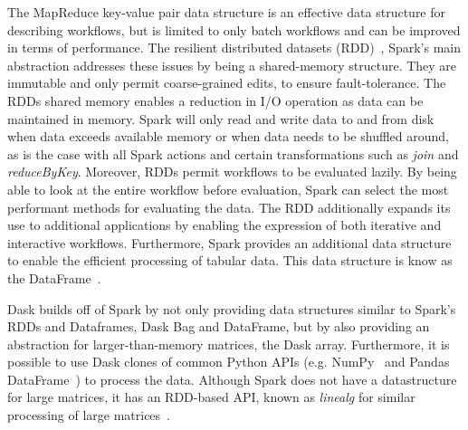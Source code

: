                 The MapReduce key-value pair data structure is an effective data
                structure for describing workflows, but is limited to only batch
                workflows and can be improved in terms of performance. The
                resilient distributed datasets
                (RDD)~\cite{Zaharia:2012:RDD:2228298.2228301}, Spark's main
                abstraction addresses these issues by being a shared-memory
                structure. They are immutable and only permit coarse-grained
                edits, to ensure fault-tolerance. The RDDs shared memory enables
                a reduction in I/O operation as data can be maintained in
                memory. Spark will only read and write data to and from disk
                when data exceeds available memory or when data needs to be
                shuffled around, as is the case with all Spark actions and
                certain transformations such as \textit{join} and
                \textit{reduceByKey}. Moreover, RDDs permit workflows to be
                evaluated lazily. By being able to look at the entire workflow
                before evaluation, Spark can select the most performant methods
                for evaluating the data. The RDD additionally expands its use to
                additional applications by enabling the expression of both
                iterative and interactive workflows. Furthermore, Spark provides
                an additional data structure to enable the efficient processing
                of tabular data. This data structure is know as the
                DataFrame~\cite{Armbrust:2015:SSR:2723372.2742797}.

                Dask builds off of Spark by not only providing data structures
                similar to Spark's RDDs and Dataframes, Dask Bag and DataFrame,
                but by also providing an abstraction for larger-than-memory
                matrices, the Dask array. Furthermore, it is possible to use
                Dask clones of common Python APIs (e.g.
                NumPy~\cite{Oliphant:2015:GN:2886196} and Pandas
                DataFrame~\cite{mckinney2011pandas}) to process the data.
                Although Spark does not have a datastructure for large matrices,
                it has an RDD-based API, known as \textit{linealg} for similar
                processing of large
                matrices~\cite{BosaghZadeh:2016:MCO:2939672.2939675}.


